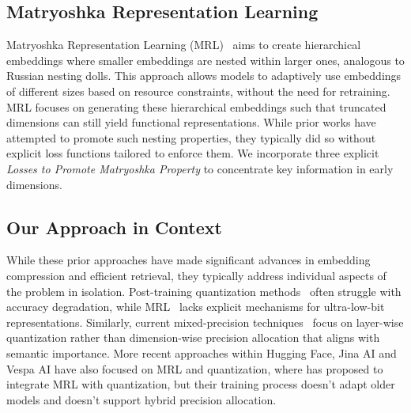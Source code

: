 \subsection{Matryoshka Representation Learning}
Matryoshka Representation Learning (MRL)~\cite{kusupati2021matryoshka} aims to create hierarchical embeddings where smaller embeddings are nested within larger ones, analogous to Russian nesting dolls. 
This approach allows models to adaptively use embeddings of different sizes based on resource constraints, without the need for retraining. 
MRL focuses on generating these hierarchical embeddings such that truncated dimensions can still yield functional representations. 
While prior works have attempted to promote such nesting properties, they typically did so without explicit loss functions tailored to enforce them.
We incorporate three explicit \emph{Losses to Promote Matryoshka Property} to concentrate key information in early dimensions. 

\subsection{Our Approach in Context}




While these prior approaches have made significant advances in embedding compression and efficient retrieval, they typically address individual aspects of the problem in isolation. 
Post-training quantization methods~\cite{jacob2018quantization} often struggle with accuracy degradation, while MRL~\cite{kusupati2021matryoshka} lacks explicit mechanisms for ultra-low-bit representations. 
Similarly, current mixed-precision techniques~\cite{dong2019hawq} focus on layer-wise quantization rather than dimension-wise precision allocation that aligns with semantic importance. More recent approaches within Hugging Face, Jina AI and Vespa AI \cite{hf2024quantization, vespa2024matryoshka, jina2024binary} have also focused on MRL and quantization, where \cite{vespa2024matryoshka} has proposed to integrate MRL with quantization, but their training process doesn't adapt older models and doesn't support hybrid precision allocation.

